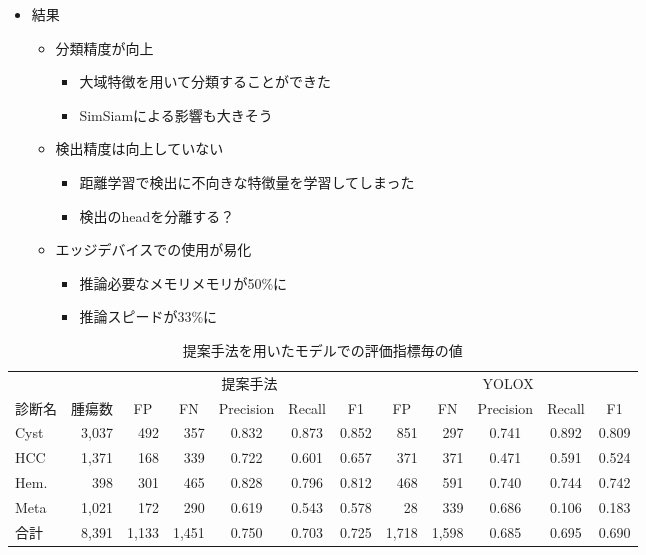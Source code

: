 \documentclass{ujarticle}
\begin{document}
        \begin{itemize}
            \item 結果
            \begin{itemize}
                \item 分類精度が向上
                \begin{itemize}
                    \item 大域特徴を用いて分類することができた
                    \item SimSiamによる影響も大きそう
                \end{itemize}
                \item 検出精度は向上していない
                \begin{itemize}
                    \item 距離学習で検出に不向きな特徴量を学習してしまった
                    \item 検出のheadを分離する？
                \end{itemize}
                \item エッジデバイスでの使用が易化
                \begin{itemize}
                    \item 推論必要なメモリメモリが50\%に
                    \item 推論スピードが33\%に
                \end{itemize}
            \end{itemize}
        \end{itemize}

        \begin{table}[!h]
            \centering
            \caption{提案手法を用いたモデルでの評価指標毎の値}
            \label{tab:metric}
                \begin{tabular}{lr|rr|ccc|rr|ccc} \hline
                    & & \multicolumn{5}{c|}{提案手法} & \multicolumn{5}{c}{YOLOX} \\
                    診断名 & \multicolumn{1}{c|}{腫瘍数} & \multicolumn{1}{c}{FP} & \multicolumn{1}{c|}{FN} & Precision & Recall & F1 & \multicolumn{1}{c}{FP} & \multicolumn{1}{c|}{FN} & Precision & Recall & F1 \\ \hline
                    Cyst & 3,037 & 492 & 357 & 0.832 & 0.873 & 0.852 & 851 & 297 & 0.741 & 0.892 & 0.809 \\
                    HCC & 1,371 & 168 & 339 & 0.722 & 0.601 & 0.657 & 371 & 371 & 0.471 & 0.591 & 0.524 \\
                    Hem. & 398 & 301 & 465 & 0.828 & 0.796 & 0.812 & 468 & 591 & 0.740 & 0.744 & 0.742 \\
                    Meta & 1,021 & 172 & 290 & 0.619 & 0.543 & 0.578 & 28 & 339 & 0.686 & 0.106 & 0.183 \\ \hline
                    合計 & 8,391 & 1,133 & 1,451 & 0.750 & 0.703 & 0.725 & 1,718 & 1,598 & 0.685 & 0.695 & 0.690 \\ \hline
                \end{tabular}
        \end{table}
\end{document}
